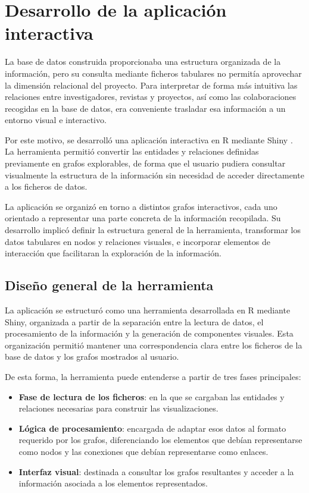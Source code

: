 \documentclass[11pt,spanish,listoffigures,listoftables]{tfgetsinf}
\begin{document}


\chapter{Desarrollo de la aplicación interactiva}

La base de datos construida proporcionaba una estructura organizada de la información, pero su consulta mediante ficheros tabulares no permitía aprovechar la dimensión relacional del proyecto. Para interpretar de forma más intuitiva las relaciones entre investigadores, revistas y proyectos, así como las colaboraciones recogidas en la base de datos, era conveniente trasladar esa información a un entorno visual e interactivo.

Por este motivo, se desarrolló una aplicación interactiva en R mediante Shiny \cite{shiny}. La herramienta permitió convertir las entidades y relaciones definidas previamente en grafos explorables, de forma que el usuario pudiera consultar visualmente la estructura de la información sin necesidad de acceder directamente a los ficheros de datos.

La aplicación se organizó en torno a distintos grafos interactivos, cada uno orientado a representar una parte concreta de la información recopilada. Su desarrollo implicó definir la estructura general de la herramienta, transformar los datos tabulares en nodos y relaciones visuales, e incorporar elementos de interacción que facilitaran la exploración de la información.

\section{Diseño general de la herramienta}

La aplicación se estructuró como una herramienta desarrollada en R mediante Shiny, organizada a partir de la separación entre la lectura de datos, el procesamiento de la información y la generación de componentes visuales. Esta organización permitió mantener una correspondencia clara entre los ficheros de la base de datos y los grafos mostrados al usuario.

De esta forma, la herramienta puede entenderse a partir de tres fases principales:

\begin{itemize}
    \item \textbf{Fase de lectura de los ficheros}: en la que se cargaban las entidades y relaciones necesarias para construir las visualizaciones.

    \item \textbf{Lógica de procesamiento}: encargada de adaptar esos datos al formato requerido por los grafos, diferenciando los elementos que debían representarse como nodos y las conexiones que debían representarse como enlaces.

    \item \textbf{Interfaz visual}: destinada a consultar los grafos resultantes y acceder a la información asociada a los elementos representados.
\end{itemize}
\end{document}
